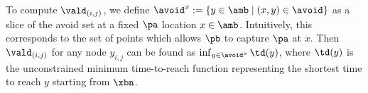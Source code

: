To compute $\vald_{(i,j)}$, we define $\avoid^{x} := \{y \in \amb \mid (x,y) \in \avoid \}$ as a slice of the avoid set at a fixed $\pa$ location $x \in \amb$.  Intuitively, this corresponds to the set of points which allows $\pb$ to capture $\pa$ at $x$.  Then $\vald_{(i,j)}$ for any node $y_{i,j}$ can be found as $\inf_{y \in \avoid^x} \td(y)$, where $\td(y)$ is the unconstrained minimum time-to-reach function representing the shortest time to reach $y$ starting from $\xbn$. 




